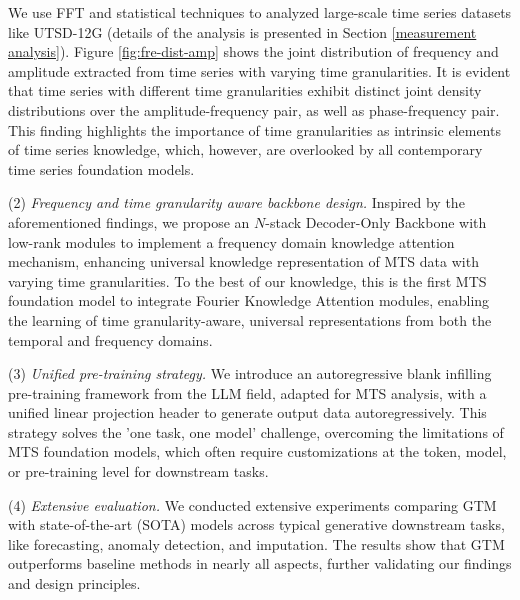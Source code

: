 We use FFT and statistical techniques to 
analyzed large-scale time series datasets like UTSD-12G \cite{Liu24} 
(details of the analysis is presented in Section \ref{measurement analysis}).  
Figure \ref{fig:fre-dist-amp} shows the joint distribution of frequency and amplitude extracted from time series with varying time granularities. It is evident that time series with different time granularities exhibit distinct joint density distributions over the amplitude-frequency pair, as well as phase-frequency pair. This finding highlights the importance of time granularities as intrinsic elements of time series knowledge, which, however, are overlooked by all contemporary time series foundation models.  
 
(2) \textit{Frequency and time granularity aware backbone design.} 
Inspired by the aforementioned findings, 
we propose an $N$-stack Decoder-Only Backbone with low-rank modules to implement a frequency domain knowledge attention mechanism, enhancing universal knowledge representation of MTS data with varying time granularities. To the best of our knowledge, this is the first MTS foundation model to integrate Fourier Knowledge Attention modules, enabling the learning of time granularity-aware, universal representations from both the temporal and frequency domains.  

(3) \textit{Unified pre-training strategy.} 
We introduce an autoregressive blank infilling pre-training framework from the LLM field, adapted for MTS analysis, with a unified linear projection header to generate output data autoregressively. This strategy solves the 'one task, one model' challenge, overcoming the limitations of MTS foundation models, which often require customizations at the token, model, or pre-training level for downstream tasks.    

(4) \textit{Extensive evaluation.}  
We conducted extensive experiments comparing GTM with state-of-the-art (SOTA) models across typical generative downstream tasks, like forecasting, anomaly detection, and imputation. The results show that GTM outperforms baseline methods in nearly all aspects, further validating our findings and design principles.

 


 
 

